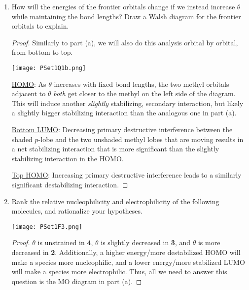 \documentclass[../psets.tex]{subfiles}
\begin{document}
\begin{enumerate}
\begin{enumerate}
\begin{proof}
            \underline{Top LUMO}: As $\theta$ decreases, we'll gain some destructive secondary interference, but we'll mostly lose primary destructive interference as we approach a primary nonbonding orientation in the nodal plane of the $p$-orbital. Thus, the energy of this orbital will go down on a similar order of magnitude to how much the bottom LUMO went up.
        \end{proof}
        \item How will the energies of the frontier orbitals change if we instead increase $\theta$ while maintaining the bond lengths? Draw a Walsh diagram for the frontier orbitals to explain.
        \begin{proof}
            Similarly to part (a), we will also do this analysis orbital by orbital, from bottom to top.\par
            \begin{center}
                \texttt{[image: PSet1Q1b.png]}
            \end{center}
            \underline{HOMO}: As $\theta$ increases with fixed bond lengths, the two methyl orbitals adjacent to $\theta$ \emph{both} get closer to the methyl on the left side of the diagram. This will induce another \emph{slightly} stabilizing, secondary interaction, but likely a slightly bigger stabilizing interaction than the analogous one in part (a).\par
            \underline{Bottom LUMO}: Decreasing primary destructive interference between the shaded $p$-lobe and the two unshaded methyl lobes that are moving results in a net stabilizing interaction that is more significant than the slightly stabilizing interaction in the HOMO.\par
            \underline{Top HOMO}: Increasing primary destructive interference leads to a similarly significant destabilizing interaction.
        \end{proof}
        \item Rank the relative nucleophilicity and electrophilicity of the following molecules, and rationalize your hypotheses.
        \begin{center}
            \texttt{[image: PSet1F3.png]}
        \end{center}
        \begin{proof}
            $\theta$ is unstrained in \textbf{4}, $\theta$ is slightly decreased in \textbf{3}, and $\theta$ is more decreased in \textbf{2}. Additionally, a higher energy/more destabilized HOMO will make a species more nucleophilic, and a lower energy/more stabilized LUMO will make a species more electrophilic. Thus, all we need to answer this question is the MO diagram in part (a).\par

\end{proof}
\end{enumerate}
\end{enumerate}
\end{document}
